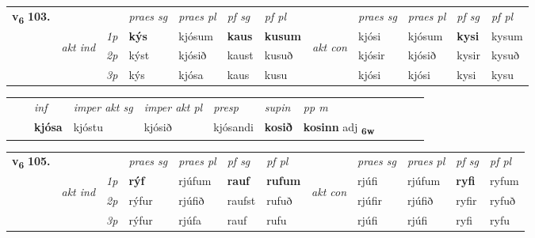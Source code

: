 \begin{tabular}{llllllllllll} \toprule
\multirow{4}{*}{{{\textbf{v{\textsubscript{6}}} \Large{\textbf{103.}}}}}  & &   &  \textit{praes sg}  & \textit{praes pl}  &\textit{ pf sg} & \textit{pf pl} &  &  \textit{praes sg}  & \textit{praes pl}  & \textit{pf sg} & \textit{pf pl } \\*
	\cmidrule{4-7} \cmidrule{9-12}
 & \multirow{3}{*}{\begin{turn}{90}\textit{akt ind}\end{turn}} & {\textit{1p}} & \textbf{kýs} & kjósum    & \textbf{kaus} & \textbf{kusum} & \multirow{3}{*}{\begin{turn}{90}\textit{akt con}\end{turn}} &kjósi & kjósum & \textbf{kysi} & kysum\\*
& &  {\textit{2p}} &  kýst  & kjósið   & kaust & kusuð & & kjósir & kjósið & kysir & kysuð \\*
& &  {\textit{3p}} & kýs & kjósa   & kaus & kusu & & kjósi & kjósi& kysi & kysu  \\*
\cmidrule{4-7} \cmidrule{9-12}
\end{tabular}


\begin{tabular}{llllllllllll}
 & & \textit{inf} & \textit{imper akt sg} & \textit{imper akt pl}   & \textit{presp} & \textit{supin}  & \textit{pp m}     \\*
  & & \textbf{kjósa} & kjóstu  & kjósið   & kjósandi &  \textbf{kosið}  & \textbf{kosinn} adj \textbf{\textsubscript{6w}} \\*
\cmidrule{1-12}
\end{tabular}



\begin{tabular}{llllllllllll} \toprule
\multirow{4}{*}{{{\textbf{v{\textsubscript{6}}} \Large{\textbf{105.}}}}}  & &   &  \textit{praes sg}  & \textit{praes pl}  &\textit{ pf sg} & \textit{pf pl} &  &  \textit{praes sg}  & \textit{praes pl}  & \textit{pf sg} & \textit{pf pl } \\*
	\cmidrule{4-7} \cmidrule{9-12}
 & \multirow{3}{*}{\begin{turn}{90}\textit{akt ind}\end{turn}} & {\textit{1p}} & \textbf{rýf} & rjúfum    & \textbf{rauf} & \textbf{rufum} & \multirow{3}{*}{\begin{turn}{90}\textit{akt con}\end{turn}} &rjúfi & rjúfum & \textbf{ryfi} & ryfum\\*
& &  {\textit{2p}} &  rýfur  & rjúfið   & raufst & rufuð & & rjúfir & rjúfið & ryfir & ryfuð \\*
& &  {\textit{3p}} & rýfur & rjúfa   & rauf & rufu & & rjúfi & rjúfi& ryfi & ryfu  \\*
\cmidrule{4-7} \cmidrule{9-12}
\end{tabular}



